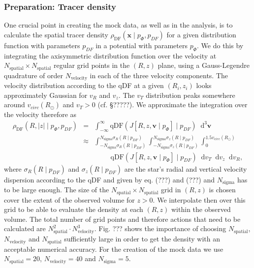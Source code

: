 \documentclass[12pt,preprint]{aastex}
\newcommand{\vect}[1]{\boldsymbol{#1}} %
\newcommand*\diff{\mathop{}\!\mathrm{d}}
\newcommand*\Diff[1]{\mathop{}\!\mathrm{d^#1}}
\begin{document}
\subsubsection{Preparation: Tracer density} \label{sec:density}

One crucial point in creating the mock data, as well as in the analysis, is to calculate the spatial tracer density $\rho_\text{DF}(\vect{x} \mid p_{\Phi},p_{DF})$ for a given distribution function with parameters $p_{DF}$ in a potential with parameters $p_{\Phi}$. We do this by integrating the axisymmetric distribution function over the velocity at $N_\text{spatial} \times N_\text{spatial}$ regular grid points in the $(R,z)$ plane, using a Gauss-Legendre quadrature of order $N_\text{velocity}$ in each of the three velocity components. The velocity distribution according to the qDF at a given $(R_i,z_i)$ looks approximately Gaussian for $v_R$ and $v_z$. The $v_T$ distribution peaks somewhere around $v_{circ}(R_\odot)$ and $v_T > 0$ (cf. \S ?????). We approximate the integration over the velocity therefore as
\begin{eqnarray}
\rho_\text{DF}(R,|z| \mid p_{\Phi},p_{DF}) &=& \int_{-\infty}^{\infty} \text{qDF}(J[R,z,\vect{v} \mid p_{\Phi}] \mid p_{DF}) \Diff3\vect{v}  \label{eq:tracerdensity_general}\\
&\approx& \int_{-N_\text{sigma} \sigma_R(R \mid p_{DF})}^{N_\text{sigma} \sigma_R(R \mid p_{DF})} \int_{-N_\text{sigma}\sigma_z(R \mid p_{DF})}^{N_\text{sigma} \sigma_z(R \mid p_{DF})} \int_{0}^{1.5 v_{circ}(R_\odot)}  \nonumber\\
& & \hspace{1cm} \text{qDF}(J[R,z,\vect{v} \mid p_{\Phi}] \mid p_{DF}) \diff v_T \diff v_z \diff v_R, \label{eq:tracerdensity}
\end{eqnarray}
where $\sigma_R(R \mid p_{DF})$ and $\sigma_z(R \mid p_{DF})$ are the star's radial and vertical velocity dispersion according to the qDF and given by eq. (???) and (???) and $N_\text{sigma}$ has to be large enough. The size of the $N_\text{spatial} \times N_\text{spatial}$ grid in $(R,z)$ is chosen cover the extent of the observed volume for $z>0$. We interpolate then over this grid to be able to evaluate the density at each $(R,z)$ within the observed volume. The total number of grid points and therefore actions that need to be calculated are $N_\text{spatial}^2 \cdot N_\text{velocity}^3$. Fig. ??? shows the importance of choosing $N_\text{spatial}$, $N_\text{velocity}$ and $N_\text{spatial}$ sufficiently large in order to get the density with an acceptable numerical accuracy. For the creation of the mock data we use $N_\text{spatial} = 20$, $N_\text{velocity} = 40$ and $N_\text{sigma}=5$.
\end{document}
